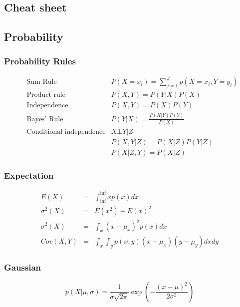 \documentclass[main]{subfiles}
\begin{document}
\begin{landscape}
\section{Cheat sheet}
%
%
\begin{multicols}{3}
\scriptsize
\subsection{Probability}
\subsubsection{Probability Rules}
\begin{eqnarray}
&\text{Sum Rule}& P(X=x_i) = \sum_{j=1}^{J} p(X=x_i,Y=y_i)\\
&\text{Product rule}& P(X, Y) = P(Y|X) P(X) \\
&\text{Independence}& P(X, Y) = P(X)P(Y) \\
&\text{Bayes' Rule}& P(Y|X) = \frac{P(X|Y)P(Y)}{P(X)} \\
&\text{Conditional independence}& X\bot Y|Z \\
& & P(X,Y|Z) = P(X|Z)P(Y|Z) \\
& & P(X|Z,Y) = P(X|Z)
\end{eqnarray}
\subsubsection{Expectation}
\begin{eqnarray}
E(X) &=& \int_{\inf}^{\inf} x p(x) dx \\
\sigma^2(X) &=& E(x^2)-{E(x)}^2 \\
\sigma^2(X) &=& \int_x (x-\mu_x)^2 p(x) dx \\
Cov(X, Y) &=& \int_x \int_y p(x,y) (x-\mu_x)(y-\mu_y) dx dy
\end{eqnarray}

\subsubsection{Gaussian}
\begin{equation}
p(X|\mu,\sigma)=\frac{1}{\sigma \sqrt{2\pi}} \exp(-\frac{(x-\mu)^2}{2\sigma^2})
\end{equation}


\end{multicols}
\end{landscape}
\end{document}
